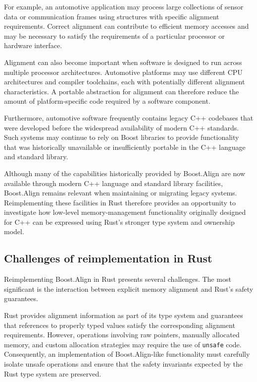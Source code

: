 For example, an automotive application may process large collections of sensor data or 
communication frames using structures with specific alignment requirements. 
Correct alignment can contribute to efficient memory accesses and may be necessary to satisfy 
the requirements of a particular processor or hardware interface.

Alignment can also become important when software is designed to run across multiple processor architectures. 
Automotive platforms may use different CPU architectures and compiler toolchains, each with potentially different alignment characteristics. 
A portable abstraction for alignment can therefore reduce the amount of platform-specific code required by a software component.

Furthermore, automotive software frequently contains legacy C++ codebases that were developed before the widespread availability 
of modern C++ standards. Such systems may continue to rely on Boost libraries to provide functionality 
that was historically unavailable or insufficiently portable in the C++ language and standard library.

Although many of the capabilities historically provided by Boost.Align are now available through modern C++ language and 
standard library facilities, Boost.Align remains relevant when maintaining or migrating legacy systems. 
Reimplementing these facilities in Rust therefore provides an opportunity 
to investigate how low-level memory-management functionality originally designed for C++ can be expressed 
using Rust's stronger type system and ownership model.

\subsection{Challenges of reimplementation in Rust}

Reimplementing Boost.Align in Rust presents several challenges. 
The most significant is the interaction between explicit memory alignment and Rust's safety guarantees.

Rust provides alignment information as part of its type system and guarantees that references 
to properly typed values satisfy the corresponding alignment requirements. 
However, operations involving raw pointers, manually allocated memory, and custom allocation strategies 
may require the use of \texttt{unsafe} code. 
Consequently, an implementation of Boost.Align-like functionality must carefully isolate unsafe operations and 
ensure that the safety invariants expected by the Rust type system are preserved.

